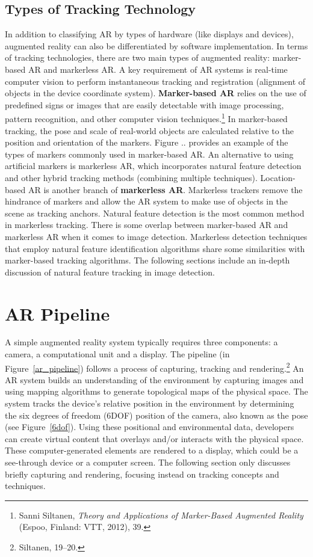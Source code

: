 \subsection{Types of Tracking Technology}\label{trackingtech}
In addition to classifying AR by types of hardware (like displays and devices), augmented reality can also be differentiated by software implementation. In terms of tracking technologies, there are two main types of augmented reality: marker-based AR and markerless AR. A key requirement of AR systems is real-time computer vision to perform instantaneous tracking and registration (alignment of objects in the device coordinate system). \textbf{Marker-based AR} relies on the use of predefined signs or images that are easily detectable with image processing, pattern recognition, and other computer vision techniques.\footnote{Sanni Siltanen, \textit{Theory and Applications of Marker-Based Augmented Reality} (Espoo, Finland: VTT, 2012), 39.} In marker-based tracking, the pose and scale of real-world objects are calculated relative to the position and orientation of the markers. Figure .. provides an example of the types of markers commonly used in marker-based AR. An alternative to using artificial markers is markerless AR, which incorporates natural feature detection and other hybrid tracking methods (combining multiple techniques). Location-based AR is another branch of \textbf{markerless AR}. Markerless trackers remove the hindrance of markers and allow the AR system to make use of objects in the scene as tracking anchors. Natural feature detection is the most common method in markerless tracking. There is some overlap between marker-based AR and markerless AR when it comes to image detection. Markerless detection techniques that employ natural feature identification algorithms share some similarities with marker-based tracking algorithms. The following sections include an in-depth discussion of natural feature tracking in image detection.

\section{AR Pipeline}
A simple augmented reality system typically requires three components: a camera, a computational unit and a display. The pipeline (in Figure~\ref{ar_pipeline}) follows a process of capturing, tracking and rendering.\footnote{Siltanen, 19–20.} An AR system builds an understanding of the environment by capturing images and using mapping algorithms to generate topological maps of the physical space. The system tracks the device’s relative position in the environment by determining the six degrees of freedom (6DOF) position of the camera, also known as the pose (see Figure~\ref{6dof}). Using these positional and environmental data, developers can create virtual content that overlays and/or interacts with the physical space. These computer-generated elements are rendered to a display, which could be a see-through device or a computer screen. The following section only discusses briefly capturing and rendering, focusing instead on tracking concepts and techniques.

